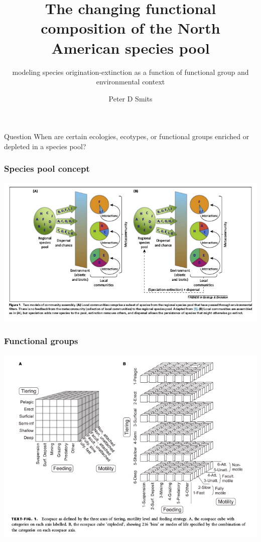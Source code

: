 \documentclass{beamer}
\title{The changing functional composition of the North American species pool}
\subtitle{modeling species origination-extinction as a function of functional group and environmental context}
\author{Peter D Smits}
\institute{Committee on Evolutionary Biology, University of Chicago}
\date{}
\begin{document}
\begin{frame}
  \maketitle
\end{frame}


\begin{frame}
  \begin{alertblock}{Question}
    When are certain ecologies, ecotypes, or functional groups enriched or depleted in a species pool?
  \end{alertblock}
\end{frame}

\begin{frame}
  \frametitle{Species pool concept}

  \begin{center}
    \includegraphics[height=0.8\textheight,width=\textwidth,keepaspectratio=true]{figure/schemske_pool}
  \end{center}

\end{frame}

\begin{frame}
  \frametitle{Functional groups}

  \begin{center}
    \includegraphics[height=0.8\textheight,width=\textwidth,keepaspectratio=true]{figure/ecocube}
  \end{center}

  \tiny{}
\end{frame}
\end{document}
